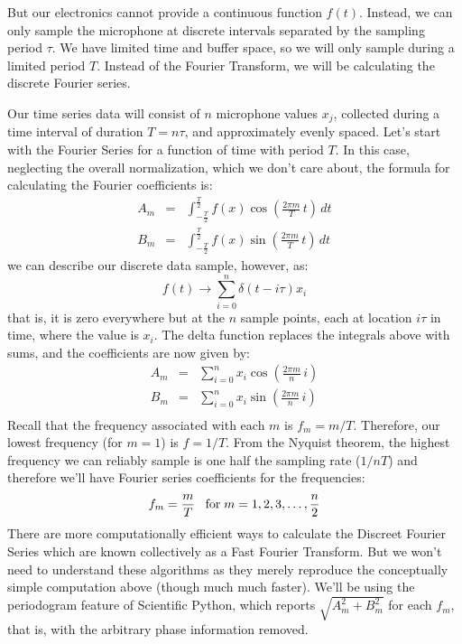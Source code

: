 \documentclass[12pt]{article}
\begin{document}
But our electronics cannot provide a continuous function $f(t)$.  Instead, we can only sample the microphone at discrete intervals separated by the sampling period $\tau$.  We have limited time and buffer space, so we will only sample during a limited period $T$.  Instead of the Fourier Transform, we will be calculating the discrete Fourier series.

Our time series data will consist of $n$ microphone values $x_j$, collected during a time interval of duration $T = n\tau$, and approximately evenly spaced.    Let's start with the Fourier Series for a function of time with period $T$.  In this case, neglecting the overall normalization, which we don't care about, the formula for calculating the Fourier coefficients is:
\begin{eqnarray*}
A_m &=&  \int_{-\frac{T}{2}}^{\frac{T}{2}} 
f(x) \cos\left(\frac{2\pi m}{T} \, t \right) \, dt \\
B_m &=& \int_{-\frac{T}{2}}^{\frac{T}{2}} 
f(x) \sin\left(\frac{2\pi m}{T} \, t \right) \, dt
\end{eqnarray*}
we can describe our discrete data sample, however, as:
\begin{equation*}
f(t) \to \sum_{i=0}^n \delta(t-i\tau) x_i
\end{equation*}
that is, it is zero everywhere but at the $n$ sample points, each at location $i\tau$ in time, where the value is $x_i$.
The delta function replaces the integrals above with sums, and the coefficients are now given by:
\begin{eqnarray*}
A_m &=&  \sum_{i=0}^n x_i  \cos\left(\frac{2\pi m}{n} \, i \right) \\
B_m &=&  \sum_{i=0}^n x_i  \sin\left(\frac{2\pi m}{n} \, i \right) \\
\end{eqnarray*}
Recall that the frequency associated with each $m$ is $f_m = m / T$.  Therefore, our lowest frequency (for $m=1$) is $f=1/T$.  From the Nyquist theorem, the highest frequency we can reliably sample is one half the sampling rate ($1/nT$) and therefore we'll have Fourier series coefficients for the frequencies:
\begin{displaymath}
f_m = \frac{m}{T} \; \; \; {\rm for} \; m=1,2,3,\ldots,\frac{n}{2}
\end{displaymath}
There are more computationally efficient ways to calculate the Discreet Fourier Series which are known collectively as a Fast Fourier Transform.   But we won't need to understand these algorithms as they merely reproduce the conceptually simple computation above (though much much faster).  We'll be using the periodogram feature of Scientific Python, which reports $\sqrt{A_m^2 + B_m^2}$ for each $f_m$, that is, with the arbitrary phase information removed.
\end{document}
